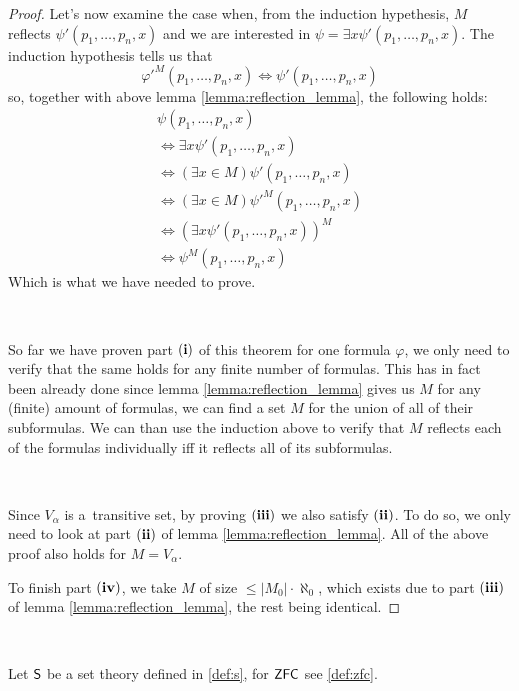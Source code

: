 \begin{proof}
Let's now examine the case when, from the induction hypethesis, $M$ reflects $\psi'(p_1, \ldots, p_n, x)$ and we are interested in $\psi = \exists x \psi'(p_1, \ldots, p_n, x)$.
The induction hypothesis tells us that 
\begin{equation}
\varphi'^M(p_1, \ldots, p_n, x) \iff \psi'(p_1, \ldots, p_n, x)
\end{equation}
so, together with above lemma \ref{lemma:reflection_lemma}, the following holds:
\begin{equation}
\begin{gathered}
\psi(p_1, \ldots, p_n, x) \\
\iff \exists x \psi'(p_1, \ldots, p_n, x) \\
\iff (\exists x \in M) \psi'(p_1, \ldots, p_n, x) \\
\iff (\exists x \in M) \psi'^M (p_1, \ldots, p_n, x) \\
\iff (\exists x \psi'(p_1, \ldots, p_n, x))^M \\
\iff \psi^M(p_1, \ldots, p_n, x)
\end{gathered}
\end{equation}
Which is what we have needed to prove. %

\

So far we have proven part $\bold{(i)}$ of this theorem for one formula $\varphi$, we only need to verify that the same holds for any finite number of formulas. This has in fact been already done since lemma \ref{lemma:reflection_lemma} gives us $M$ for any (finite) amount of formulas, we can find a set $M$ for the union of all of their subformulas. We can than use the induction above  to verify that $M$ reflects each of the formulas individually iff it reflects all of its subformulas.

\

Since $V_\alpha$ is a~transitive set, by proving $\bold{(iii)}$ we also satisfy $\bold{(ii)}$. To do so, we only need to look at part $\bold{(ii)}$ of lemma \ref{lemma:reflection_lemma}. All of the above proof also holds for $M = V_\alpha$. 

To finish part $\bold{(iv)}$, we take $M$ of size $\leq |M_0| \cdot \aleph_0$, which exists due to part $\bold{(iii)}$ of lemma \ref{lemma:reflection_lemma}, the rest being identical.
\end{proof}

\

Let $\sf{S}$ be a set theory defined in \ref{def:s}, for $\sf{ZFC}$ see \ref{def:zfc}.

